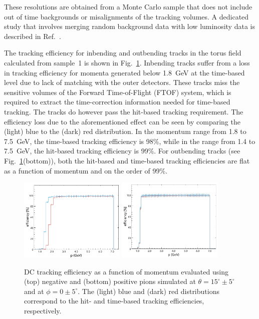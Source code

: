 These resolutions are obtained from a Monte Carlo sample that does not include out of time backgrounds or
misalignments of the tracking volumes. A dedicated study that involves merging random background data with
low luminosity data is described in Ref.~\cite{clas12-nim}.

The tracking efficiency for inbending and outbending tracks in the torus field calculated from sample~1 is shown in
Fig.~\ref{fig:trkeff}. Inbending tracks suffer from a loss in tracking efficiency for momenta generated below
1.8~GeV at the time-based level due to lack of matching with the outer detectors. These tracks miss the sensitive
volumes of the Forward Time-of-Flight (FTOF) system, which is required to extract the time-correction information
needed for time-based tracking. The tracks do however pass the hit-based tracking requirement. The efficiency
loss due to the aforementioned effect can be seen by comparing the (light) blue to the (dark) red distribution. In
the momentum range from 1.8 to 7.5~GeV, the time-based tracking efficiency is 98\%, while in the range from
1.4 to 7.5~GeV, the hit-based tracking efficiency is 99\%. For outbending tracks (see Fig.~\ref{fig:trkeff}(bottom)),
both the hit-based and time-based tracking efficiencies are flat as a function of momentum and on the order of 99\%. 

\begin{figure}[t]
\includegraphics[width=0.45\textwidth]{pics/DCTrkgEffNegTrks.png}
\includegraphics[width=0.45\textwidth]{pics/DCTrkgEffPosTrks.png}
\caption{DC tracking efficiency as a function of momentum evaluated using  (top) negative and (bottom) positive pions
  simulated at $\theta =15^\circ \pm 5^\circ$ and at $\phi = 0 \pm 5^\circ$. The (light) blue and (dark) red distributions
  correspond to the hit- and time-based tracking efficiencies, respectively.}
\label{fig:trkeff}
\end{figure}

